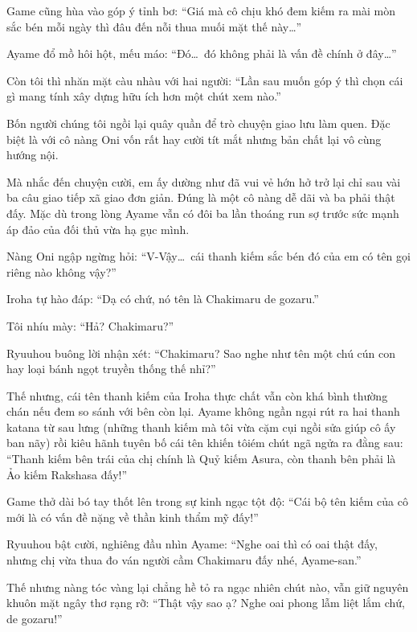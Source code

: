 \documentclass[../main.tex]{subfiles}
\begin{document}
Game cũng hùa vào góp ý tỉnh bơ: ``Giá mà cô chịu khó đem kiếm ra mài mòn sắc bén mỗi ngày thì đâu đến nỗi thua muối mặt thế này\dots''

Ayame đổ mồ hôi hột, mếu máo: ``Đó\dots\ đó không phải là vấn đề chính ở đây\dots''

Còn tôi thì nhăn mặt càu nhàu với hai người: ``Lần sau muốn góp ý thì chọn cái gì mang tính xây dựng hữu ích hơn một chút xem nào.''

\ct

Bốn người chúng tôi ngồi lại quây quần để trò chuyện giao lưu làm quen. Đặc biệt là với cô nàng Oni vốn rất hay cười tít mắt nhưng bản chất lại vô cùng hướng nội.

Mà nhắc đến chuyện cười, em ấy dường như đã vui vẻ hớn hở trở lại chỉ sau vài ba câu giao tiếp xã giao đơn giản. Đúng là một cô nàng dễ dãi và ba phải thật đấy. Mặc dù trong lòng Ayame vẫn có đôi ba lần thoáng run sợ trước sức mạnh áp đảo của đối thủ vừa hạ gục mình.

Nàng Oni ngập ngừng hỏi: ``V-Vậy\dots\ cái thanh kiếm sắc bén đó của em có tên gọi riêng nào không vậy?''

Iroha tự hào đáp: ``Dạ có chứ, nó tên là Chakimaru de gozaru.''


Tôi nhíu mày: ``Hả? Chakimaru?''

Ryuuhou buông lời nhận xét: ``Chakimaru? Sao nghe như tên một chú cún con hay loại bánh ngọt truyền thống thế nhỉ?''

Thế nhưng, cái tên thanh kiếm của Iroha thực chất vẫn còn khá bình thường chán nếu đem so sánh với bên còn lại. Ayame không ngần ngại rút ra hai thanh katana từ sau lưng (những thanh kiếm mà tôi vừa cặm cụi ngồi sửa giúp cô ấy ban nãy) rồi kiêu hãnh tuyên bố cái tên khiến tôiém chút ngã ngửa ra đằng sau: ``Thanh kiếm bên trái của chị chính là Quỷ kiếm Asura, còn thanh bên phải là Ảo kiếm Rakshasa đấy!''


Game thở dài bó tay thốt lên trong sự kinh ngạc tột độ: ``Cái bộ tên kiếm của cô mới là có vấn đề nặng về thần kinh thẩm mỹ đấy!''

Ryuuhou bật cười, nghiêng đầu nhìn Ayame: ``Nghe oai thì có oai thật đấy, nhưng chị vừa thua đo ván người cầm Chakimaru đấy nhé, Ayame-san.''

Thế nhưng nàng tóc vàng lại chẳng hề tỏ ra ngạc nhiên chút nào, vẫn giữ nguyên khuôn mặt ngây thơ rạng rỡ: ``Thật vậy sao ạ? Nghe oai phong lẫm liệt lắm chứ, de gozaru!''
\end{document}
